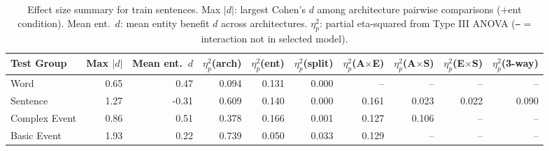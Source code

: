 \begin{table}[t]
\centering\scriptsize
\begin{tabular}{@{}lrrrrrrrrr@{}}
\toprule
\textbf{Test Group} & \textbf{Max $|d|$} & \textbf{Mean ent.\ $d$} & $\eta^2_p$(arch) & $\eta^2_p$(ent) & $\eta^2_p$(split) & $\eta^2_p$(A$\times$E) & $\eta^2_p$(A$\times$S) & $\eta^2_p$(E$\times$S) & $\eta^2_p$(3-way) \\
\midrule
Word & 0.65 & 0.47 & 0.094 & 0.131 & 0.000 & -- & -- & -- & -- \\
Sentence & 1.27 & -0.31 & 0.609 & 0.140 & 0.000 & 0.161 & 0.023 & 0.022 & 0.090 \\
Complex Event & 0.86 & 0.51 & 0.378 & 0.166 & 0.001 & 0.127 & 0.106 & -- & -- \\
Basic Event & 1.93 & 0.22 & 0.739 & 0.050 & 0.033 & 0.129 & -- & -- & -- \\
\bottomrule
\end{tabular}
\caption{Effect size summary for train sentences. Max $|d|$: largest Cohen's $d$ among architecture pairwise comparisons ($+$ent condition). Mean ent.\ $d$: mean entity benefit $d$ across architectures. $\eta^2_p$: partial eta-squared from Type III ANOVA (\texttt{--} = interaction not in selected model).}
\label{tab:train_effect_sizes}
\end{table}
